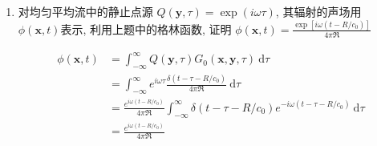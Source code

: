 \begin{enumerate}
    
    \item 对均匀平均流中的静止点源  
    \( Q(\boldsymbol{y}, \tau)=\exp (i \omega \tau) \), 
    其辐射的声场用  
    \( \phi(\boldsymbol{x}, t) \)表示, 
    利用上题中的格林函数, 证明  
    \( \phi(\boldsymbol{x}, t)=\frac{\exp \left[i \omega\left(t-R / c_{0}\right)\right]}{4 \pi \Re} \)

        \begin{equation}
            \begin{aligned}
                \phi(\boldsymbol{x}, t)
                &= \int_{-\infty}^{\infty} Q(\boldsymbol{y}, \tau) G_{0}(\boldsymbol{x}, \boldsymbol{y}, \tau) \mathrm{~d} \tau \\
                &= \int_{-\infty}^{\infty} e^{i \omega \tau} \frac{\delta\left(t-\tau-R / c_{0}\right)}{4 \pi \Re} \mathrm{~d} \tau \\
                &= \frac{e^{i \omega (t - R / c_{0})}}{4 \pi \Re} \int_{-\infty}^{\infty} \delta\left(t-\tau-R / c_{0}\right) e^{- i \omega (t - \tau - R / c_{0})} \mathrm{~d} \tau \\
                &= \frac{e^{i \omega (t - R / c_{0})}}{4 \pi \Re}
            \end{aligned}
        \end{equation}
        
\end{enumerate}

\clearpage